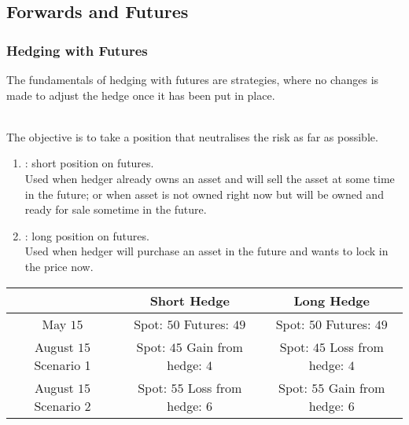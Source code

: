 \subsection{Forwards and Futures}

\subsubsection{Hedging with Futures}

The fundamentals of hedging with futures are  strategies, where no changes is made to adjust the hedge once it has been put in place.

\begin{definition}
\\
The objective is to take a position that neutralises the risk as far as possible.
\begin{enumerate}[label=\roman*.]
\setlength{\itemsep}{0pt}
\item {}: short position on futures. \\
Used when hedger already owns an asset and will sell the asset at some time in the future; or when asset is not owned right now but will be owned and ready for sale sometime in the future.
\item {}: long position on futures. \\
Used when hedger will purchase an asset in the future and wants to lock in the price now.
\end{enumerate}
\begin{table}[h]
\begin{tabular}{|c | c | c|}
\hline
 & \textbf{Short Hedge} & \textbf{Long Hedge} \\ \hline
May $15$ & \makecell[l]{Spot: $50$ \\ Futures: $49$} & \makecell[l]{Spot: $50$ \\ Futures: $49$} \\ \hline
August $15$ Scenario 1 & \makecell[l]{Spot: $45$ \\ Gain from hedge: $4$} &  \makecell[l]{Spot: $45$ \\ Loss from hedge: $4$} \\ \hline
August $15$ Scenario 2 & \makecell[l]{Spot: $55$ \\ Loss from hedge: $6$} & \makecell[l]{Spot: $55$ \\ Gain from hedge: $6$} \\ \hline
\end{tabular}
\end{table}
\end{definition}

